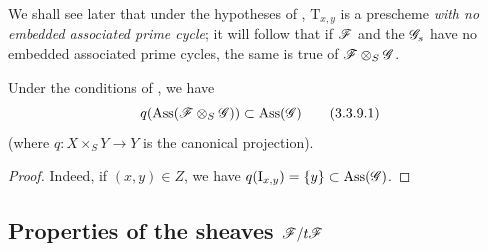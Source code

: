 \begin{remarks}[3.3.8]
\label{IV.3.3.8}
We shall see later  that under the hypotheses of , $\mathrm{T}_{x,y}$ is a prescheme \emph{with no embedded associated prime cycle}; it will follow that if $\mathscr{F}$ and the $\mathscr{G}_s$ have no embedded associated prime cycles, the same is true of $\mathscr{F}\otimes_S\mathscr{G}$.
\end{remarks}

\begin{corollary}[3.3.9]
\label{IV.3.3.9}
Under the conditions of , we have
\[
\label{IV.3.3.9.1}
q(\operatorname{Ass}(\mathscr{F}\otimes_S\mathscr{G}))\subset\operatorname{Ass}(\mathscr{G})
\tag{3.3.9.1}
\]
(where $q:X\times_S Y\to Y$ is the canonical projection).
\end{corollary}

\begin{proof}
Indeed, if $(x,y)\in Z$, we have $q(\mathrm{I}_{x,y})=\{y\}\subset\operatorname{Ass}(\mathscr{G})$.
\end{proof}


\subsection{Properties of the sheaves \texorpdfstring{$\mathscr{F}/t\mathscr{F}$}{F/tF}}
\label{subsection:IV.3.4}
\label{IV.3.4}

